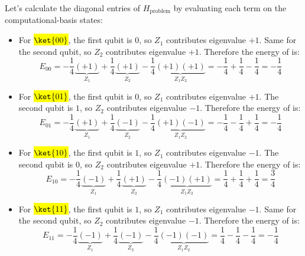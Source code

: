 \highspace
{} Let's calculate the diagonal entries of $H_{\text{problem}}$ by evaluating each term on the computational-basis states:
\begin{itemize}
    \item For \hl{$\ket{00}$}, the first qubit is $0$, so $Z_1$ contributes eigenvalue $+1$. Same for the second qubit, so $Z_2$ contributes eigenvalue $+1$. Therefore the energy of  is:
        \begin{equation*}
            E_{00} = -\frac{1}{4}\underbrace{(+1)}_{Z_1} + \frac{1}{4}\underbrace{(+1)}_{Z_2} - \frac{1}{4}\underbrace{(+1)(+1)}_{Z_1 Z_2} = -\frac{1}{4} + \frac{1}{4} - \frac{1}{4} = -\frac{1}{4}
        \end{equation*}

    \item For \hl{$\ket{01}$}, the first qubit is $0$, so $Z_1$ contributes eigenvalue $+1$. The second qubit is $1$, so $Z_2$ contributes eigenvalue $-1$. Therefore the energy of  is:
        \begin{equation*}
            E_{01} = -\frac{1}{4}\underbrace{(+1)}_{Z_1} + \frac{1}{4}\underbrace{(-1)}_{Z_2} - \frac{1}{4}\underbrace{(+1)(-1)}_{Z_1 Z_2} = -\frac{1}{4} - \frac{1}{4} + \frac{1}{4} = -\frac{1}{4}
        \end{equation*}

    \item For \hl{$\ket{10}$}, the first qubit is $1$, so $Z_1$ contributes eigenvalue $-1$. The second qubit is $0$, so $Z_2$ contributes eigenvalue $+1$. Therefore the energy of  is:
        \begin{equation*}
            E_{10} = -\frac{1}{4}\underbrace{(-1)}_{Z_1} + \frac{1}{4}\underbrace{(+1)}_{Z_2} - \frac{1}{4}\underbrace{(-1)(+1)}_{Z_1 Z_2} = \frac{1}{4} + \frac{1}{4} + \frac{1}{4} = \frac{3}{4}
        \end{equation*}

    \item For \hl{$\ket{11}$}, the first qubit is $1$, so $Z_1$ contributes eigenvalue $-1$. Same for the second qubit, so $Z_2$ contributes eigenvalue $-1$. Therefore the energy of  is:
        \begin{equation*}
            E_{11} = -\frac{1}{4}\underbrace{(-1)}_{Z_1} + \frac{1}{4}\underbrace{(-1)}_{Z_2} - \frac{1}{4}\underbrace{(-1)(-1)}_{Z_1 Z_2} = \frac{1}{4} - \frac{1}{4} - \frac{1}{4} = -\frac{1}{4}
        \end{equation*}
\end{itemize}
